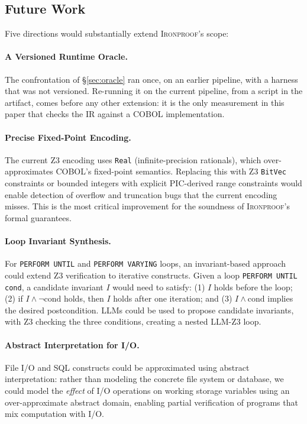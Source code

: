 \documentclass[sigconf,nonacm]{acmart}
\begin{document}
\subsection{Future Work}

Five directions would substantially extend \textsc{Ironproof}'s scope:

\paragraph{A Versioned Runtime Oracle.} The confrontation of \S\ref{sec:oracle} ran once, on an earlier pipeline, with a harness that was not versioned. Re-running it on the current pipeline, from a script in the artifact, comes before any other extension: it is the only measurement in this paper that checks the IR against a COBOL implementation.

\paragraph{Precise Fixed-Point Encoding.} The current Z3 encoding uses \texttt{Real} (infinite-precision rationals), which over-approximates COBOL's fixed-point semantics. Replacing this with Z3 \texttt{BitVec} constraints or bounded integers with explicit PIC-derived range constraints would enable detection of overflow and truncation bugs that the current encoding misses. This is the most critical improvement for the soundness of \textsc{Ironproof}'s formal guarantees.

\paragraph{Loop Invariant Synthesis.} For \texttt{PERFORM UNTIL} and \texttt{PERFORM VARYING} loops, an invariant-based approach could extend Z3 verification to iterative constructs. Given a loop \texttt{PERFORM UNTIL cond}, a candidate invariant $I$ would need to satisfy: (1) $I$ holds before the loop; (2) if $I \wedge \neg\text{cond}$ holds, then $I$ holds after one iteration; and (3) $I \wedge \text{cond}$ implies the desired postcondition. LLMs could be used to propose candidate invariants, with Z3 checking the three conditions, creating a nested LLM-Z3 loop.

\paragraph{Abstract Interpretation for I/O.} File I/O and SQL constructs could be approximated using abstract interpretation: rather than modeling the concrete file system or database, we could model the \emph{effect} of I/O operations on working storage variables using an over-approximate abstract domain, enabling partial verification of programs that mix computation with I/O.
\end{document}
